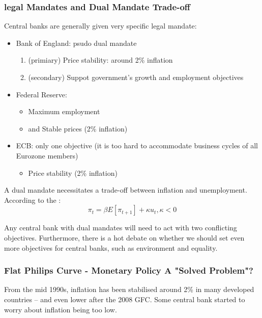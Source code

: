         \subsubsection{legal Mandates and Dual Mandate Trade-off}
            Central banks are generally given very specific legal mandate:
            \begin{itemize}
                \item Bank of England: psudo dual mandate
                \begin{enumerate}
                    \item (primiary) Price stability: around 2\% inflation
                    \item (secondary) Suppot government's growth and employment objectives
                \end{enumerate}
                \item Federal Reserve: 
                \begin{itemize}
                    \item Maximum employment
                    \item and Stable prices (2\% inflation)
                \end{itemize}
                \item ECB: only one objective (it is too hard to accommodate business cycles of all Eurozone members)
                    \begin{itemize}
                        \item Price stability (2\% inflation)
                    \end{itemize}
            \end{itemize}

            A dual mandate necessitates a trade-off between inflation and unemployment. According to the :
            $$\pi_t = \beta E[\pi_{t+1}]+\kappa u_t, \kappa<0$$
            
            Any central bank with dual mandates will need to act with two conflicting objectives. Furthermore, there is a hot debate on whether we should set even more objectives for central banks, such as environment and equality.
        
        \subsubsection{Flat Philips Curve - Monetary Policy A "Solved Problem"? }
            From the mid 1990s, inflation has been stabilised around 2\% in many developed countries -- and even lower after the 2008 GFC. Some central bank started to worry about inflation being too low.

